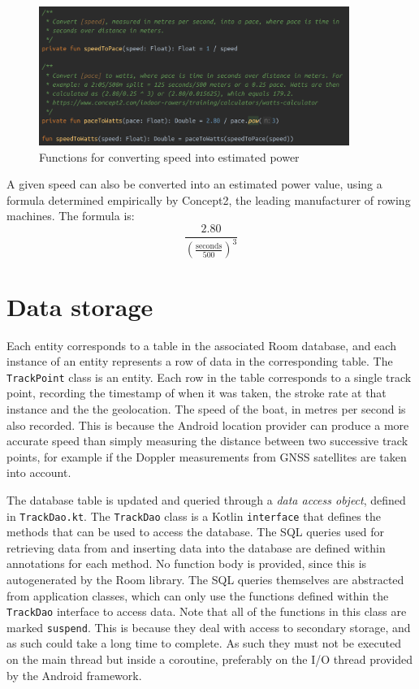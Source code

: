 \documentclass[11pt,twoside,a4paper]{report}
\begin{document}
\begin{figure}[h!]
  \centering
  \includegraphics[width=0.9\textwidth]{code-watts.png}
  \caption{Functions for converting speed into estimated power}
  \label{fig:watts}
\end{figure}

A given speed can also be converted into an estimated power value, using a formula determined empirically by Concept2, the leading manufacturer of rowing machines.\cite{c2_p2w} The formula is:
\begin{equation}
  \frac{2.80}{\left(\frac{\text{seconds}}{500}\right)^3}
\end{equation}

\section{Data storage}

Each entity corresponds to a table in the associated Room database, and each instance of an entity represents a row of data in the corresponding table. The \texttt{TrackPoint} class is an entity. Each row in the table corresponds to a single track point, recording the timestamp of when it was taken, the stroke rate at that instance and the the geolocation. The speed of the boat, in metres per second is also recorded. This is because the Android location provider can produce a more accurate speed than simply measuring the distance between two successive track points, for example if the Doppler measurements from GNSS satellites are taken into account.

The database table is updated and queried through a \textit{data access object}, defined in \texttt{TrackDao.kt}. The \texttt{TrackDao} class is a Kotlin \texttt{interface} that defines the methods that can be used to access the database. The SQL queries used for retrieving data from and inserting data into the database are defined within annotations for each method. No function body is provided, since this is autogenerated by the Room library. The SQL queries themselves are abstracted from application classes, which can only use the functions defined within the \texttt{TrackDao} interface to access data. Note that all of the functions in this class are marked \texttt{suspend}. This is because they deal with access to secondary storage, and as such could take a long time to complete. As such they must not be executed on the main thread but inside a coroutine, preferably on the I/O thread provided by the Android framework.
\end{document}
